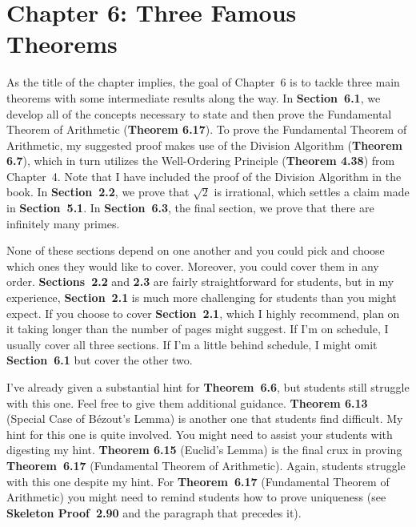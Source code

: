 \documentclass[11pt]{article}%
\newcommand{\blankline}{\pagebreak[2]\vspace{.5\baselineskip}}
\begin{document}
\section*{Chapter 6: Three Famous Theorems}

As the title of the chapter implies, the goal of Chapter~6 is to tackle three main theorems with some intermediate results along the way.  In \textbf{Section~6.1}, we develop all of the concepts necessary to state and then prove the Fundamental Theorem of Arithmetic (\textbf{Theorem 6.17}). To prove the Fundamental Theorem of Arithmetic, my suggested proof makes use of the Division Algorithm (\textbf{Theorem 6.7}), which in turn utilizes the Well-Ordering Principle (\textbf{Theorem 4.38}) from Chapter~4. Note that I have included the proof of the Division Algorithm in the book. In \textbf{Section~2.2}, we prove that $\sqrt{2}$ is irrational, which settles a claim made in \textbf{Section~5.1}. In \textbf{Section~6.3}, the final section, we prove that there are infinitely many primes.  

\blankline

None of these sections depend on one another and you could pick and choose which ones they would like to cover.  Moreover, you could cover them in any order.  \textbf{Sections~2.2} and \textbf{2.3} are fairly straightforward for students, but in my experience, \textbf{Section~2.1} is much more challenging for students than you might expect.  If you choose to cover  \textbf{Section~2.1}, which I highly recommend, plan on it taking longer than the number of pages might suggest.  If I'm on schedule, I usually cover all three sections.  If I'm a little behind schedule, I might omit \textbf{Section~6.1} but cover the other two.

\blankline

I've already given a substantial hint for \textbf{Theorem~6.6}, but students still struggle with this one.  Feel free to give them additional guidance.  \textbf{Theorem 6.13} (Special Case of B\'ezout's Lemma) is another one that students find difficult.  My hint for this one is quite involved.  You might need to assist your students with digesting my hint.  \textbf{Theorem 6.15} (Euclid's Lemma) is the final crux in proving \textbf{Theorem~6.17} (Fundamental Theorem of Arithmetic).  Again, students struggle with this one despite my hint.  For \textbf{Theorem~6.17} (Fundamental Theorem of Arithmetic) you might need to remind students how to prove uniqueness (see \textbf{Skeleton Proof~2.90} and the paragraph that precedes it).
\end{document}
